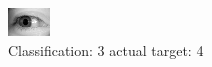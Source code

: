 \begin{figure}[h!]
\begin{center}
\includegraphics[width=0.60\columnwidth]{figures/ID3150_class_3_target_4.png}
\end{center}
\caption{ Classification: 3 actual target: 4}
\label{fig:ID3150_class_3_target_4}
\end{figure}
